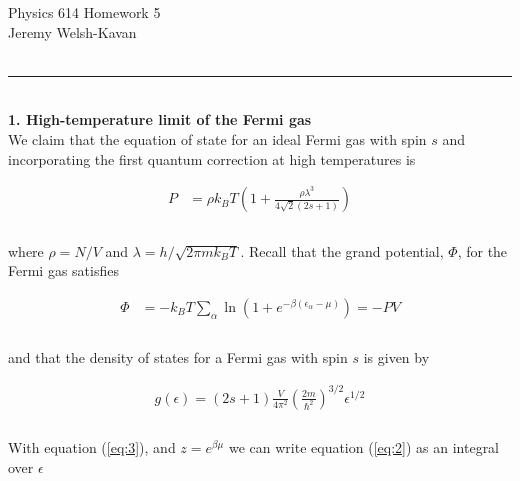 \documentclass[]{article}
\begin{document}
{\Large Physics 614 Homework 5}\\
{Jeremy Welsh-Kavan}\\
\hfill \\
\noindent\rule{15cm}{0.4pt} \\

{\bf 1. High-temperature limit of the Fermi gas} \\

We claim that the equation of state for an ideal Fermi gas with spin $s$ and incorporating the first quantum correction at high temperatures is

\begin{equation} \label{eq:1}
\begin{aligned}
P & = \rho k_B T \left( 1 + \frac{ \rho \lambda^3 }{ 4 \sqrt{2} (2s+1) }   \right) \\
\end{aligned}
\end{equation} \\

where $\rho = N/V$ and $\lambda = h/\sqrt{ 2\pi m k_B T }$. Recall that the grand potential, $\Phi$, for the Fermi gas satisfies 

\begin{equation}\label{eq:2}
\begin{aligned}
\Phi & = -k_B T \sum_\alpha \ln( 1+ e^{ - \beta(\epsilon_\alpha - \mu) }) = - PV\\
\end{aligned}
\end{equation} \\

and that the density of states for a Fermi gas with spin $s$ is given by 

\begin{equation}\label{eq:3}
\begin{aligned}
g(\epsilon) = (2s +1 ) \frac{V}{4\pi^2} \left( \frac{ 2m }{ \hbar^2} \right)^{3/2} \epsilon^{1/2} \\
\end{aligned}
\end{equation} \\

With equation (\ref{eq:3}), and $z = e^{\beta\mu}$ we can write equation (\ref{eq:2}) as an integral over $\epsilon$ 
\end{document}
